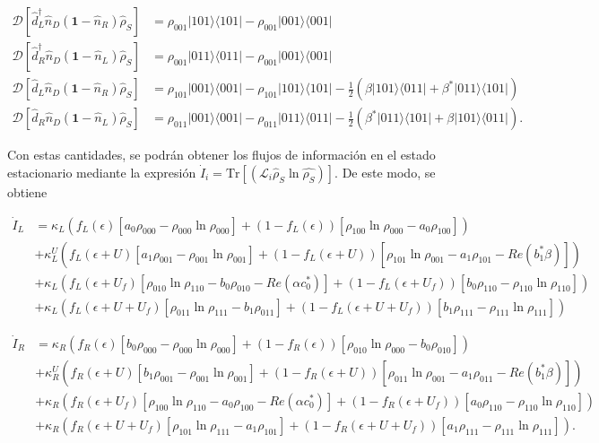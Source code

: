 \begin{appendixs}
\begin{align*}
    \mathcal{D}[\hat{d}^{\dagger}_{L}\hat{n}_{D}(\textbf{1}-\hat{n}_{R})\hat{\rho}_{S}] & = \rho_{001}|101\rangle \langle 101| - \rho_{001}|001\rangle \langle 001| \\ 
    \mathcal{D}[\hat{d}^{\dagger}_{R}\hat{n}_{D}(\textbf{1}-\hat{n}_{L})\hat{\rho}_{S}] & = \rho_{001}|011\rangle \langle 011| - \rho_{001}|001\rangle \langle 001| \\  
    \mathcal{D}[\hat{d}_{L}\hat{n}_{D}(\textbf{1}-\hat{n}_{R})\hat{\rho}_{S}] & = \rho_{101}|001\rangle \langle 001| - \rho_{101}|101\rangle \langle 101| - \frac{1}{2}(\beta |101\rangle \langle 011| + \beta^{*}|011\rangle \langle 101| ) \\ 
    \mathcal{D}[\hat{d}_{R}\hat{n}_{D}(\textbf{1}-\hat{n}_{L})\hat{\rho}_{S}] & = \rho_{011}|001\rangle \langle 001| - \rho_{011}|011\rangle \langle 011| - \frac{1}{2}(\beta^{*} |011\rangle \langle 101| + \beta|101\rangle \langle 011|  ).   
\end{align*}

Con estas cantidades, se podrán obtener los flujos de información en el estado estacionario mediante la expresión $\dot{I}_{i} = \text{Tr}[(\mathcal{L}_{i}\hat{\rho}_{S} \ln \hat{\rho_{S}}) ]$. De este modo, se obtiene 

\begin{align*}
    \dot{I}_{L} &  =  \kappa_{L}(f_{L}(\epsilon)[a_{0}\rho_{000} - \rho_{000}\ln \rho_{000}] + (1-f_{L}(\epsilon))[\rho_{100}\ln \rho_{000} - a_{0}\rho_{100} ] )  \\ 
      & + \kappa^{U}_{L}(f_{L}(\epsilon + U)[a_{1}\rho_{001} - \rho_{001}\ln \rho_{001}] + (1-f_{L}(\epsilon + U))[\rho_{101}\ln \rho_{001} -a_{1}\rho_{101} - Re(b^{*}_{1}\beta ) ]   ) \\  
      & + \kappa_{L}( f_{L}(\epsilon + U_{f})[\rho_{010}\ln \rho_{110} -b_{0}\rho_{010} - Re(\alpha c^{*}_{0}) ]  + (1-f_{L}(\epsilon + U_{f}))[b_{0}\rho_{110} - \rho_{110}\ln \rho_{110} ] ) \\  
      & + \kappa_{L}( f_{L}(\epsilon + U + U_{f})[\rho_{011}\ln \rho_{111}- b_{1}\rho_{011}] + (1-f_{L}(\epsilon+U+U_{f}) )[b_{1}\rho_{111} - \rho_{111}\ln \rho_{111}]  ) 
\end{align*}

\begin{align*}
    \dot{I}_{R} &  =  \kappa_{R}(f_{R}(\epsilon)[b_{0}\rho_{000} - \rho_{000}\ln \rho_{000}] + (1-f_{R}(\epsilon))[\rho_{010}\ln \rho_{000} - b_{0}\rho_{010} ] )  \\ 
      & + \kappa^{U}_{R}(f_{R}(\epsilon + U)[b_{1} \rho_{001} - \rho_{001}\ln \rho_{001}] + (1-f_{R}(\epsilon + U))[\rho_{011}\ln \rho_{001} -a_{1}\rho_{011} - Re(b^{*}_{1}\beta ) ]   ) \\  
      & + \kappa_{R}( f_{R}(\epsilon + U_{f})[\rho_{100}\ln \rho_{110} -a_{0}\rho_{100} - Re(\alpha c^{*}_{0}) ]  + (1-f_{R}(\epsilon + U_{f}))[a_{0}\rho_{110} - \rho_{110}\ln \rho_{110} ] ) \\  
      & + \kappa_{R}( f_{R}(\epsilon + U + U_{f})[\rho_{101}\ln \rho_{111}- a_{1}\rho_{101}] + (1-f_{R}(\epsilon+U+U_{f}) )[a_{1}\rho_{111} - \rho_{111}\ln \rho_{111}]  ). 
\end{align*}


\end{appendixs}

